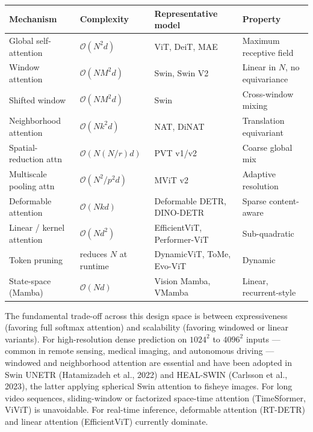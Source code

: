 {\def\LTcaptype{none} %
\begin{longtable}[]{@{}
  >{\raggedright\arraybackslash}p{}
  >{\raggedright\arraybackslash}p{}
  >{\raggedright\arraybackslash}p{}
  >{\raggedright\arraybackslash}p{}@{}}
\toprule\noalign{}
\begin{minipage}[b]{\linewidth}\raggedright
Mechanism
\end{minipage} & \begin{minipage}[b]{\linewidth}\raggedright
Complexity
\end{minipage} & \begin{minipage}[b]{\linewidth}\raggedright
Representative model
\end{minipage} & \begin{minipage}[b]{\linewidth}\raggedright
Property
\end{minipage} \\
\midrule\noalign{}
\endhead
\bottomrule\noalign{}
\endlastfoot
Global self-attention & \(\mathcal{O}(N^2 d)\) & ViT, DeiT, MAE & Maximum receptive field \\
Window attention & \(\mathcal{O}(N M^2 d)\) & Swin, Swin V2 & Linear in \(N\), no equivariance \\
Shifted window & \(\mathcal{O}(N M^2 d)\) & Swin & Cross-window mixing \\
Neighborhood attention & \(\mathcal{O}(N k^2 d)\) & NAT, DiNAT & Translation equivariant \\
Spatial-reduction attn & \(\mathcal{O}(N (N/r) d)\) & PVT v1/v2 & Coarse global mix \\
Multiscale pooling attn & \(\mathcal{O}(N^2/p^2 d)\) & MViT v2 & Adaptive resolution \\
Deformable attention & \(\mathcal{O}(N k d)\) & Deformable DETR, DINO-DETR & Sparse content-aware \\
Linear / kernel attention & \(\mathcal{O}(N d^2)\) & EfficientViT, Performer-ViT & Sub-quadratic \\
Token pruning & reduces \(N\) at runtime & DynamicViT, ToMe, Evo-ViT & Dynamic \\
State-space (Mamba) & \(\mathcal{O}(N d)\) & Vision Mamba, VMamba & Linear, recurrent-style \\
\end{longtable}
}

The fundamental trade-off across this design space is between expressiveness (favoring full softmax attention) and scalability (favoring windowed or linear variants). For high-resolution dense prediction on \(1024^2\) to \(4096^2\) inputs --- common in remote sensing, medical imaging, and autonomous driving --- windowed and neighborhood attention are essential and have been adopted in Swin UNETR (Hatamizadeh et al., 2022) and HEAL-SWIN (Carlsson et al., 2023), the latter applying spherical Swin attention to fisheye images. For long video sequences, sliding-window or factorized space-time attention (TimeSformer, ViViT) is unavoidable. For real-time inference, deformable attention (RT-DETR) and linear attention (EfficientViT) currently dominate.

